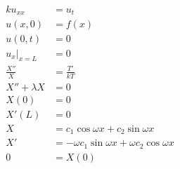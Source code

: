 \documentclass{article}
\begin{document}
\begin{align*}
  k u_{x x}        & = u_t                                                                                                                                                                     \\
  u(x, 0)          & = f(x)                                                                                                                                                                    \\
  u(0, t)          & = 0                                                                                                                                                                       \\
  u_x|_{x = L}     & = 0                                                                                                                                                                       \\
  \frac{X''}{X}    & = \frac{T'}{k T}                                                                                                                                                          \\
  X'' + \lambda X  & = 0                                                                                                                                                                       \\
  X(0)             & = 0                                                                                                                                                                       \\
  X'(L)            & = 0                                                                                                                                                                       \\
  X                & = c_1 \cos \omega x + c_2 \sin \omega x                                                                                                                                   \\
  X'               & = -\omega c_1 \sin \omega x + \omega c_2 \cos \omega x                                                                                                                    \\
  0                & = X(0)                                                                                                                                                                    \\

\end{align*}
\end{document}
